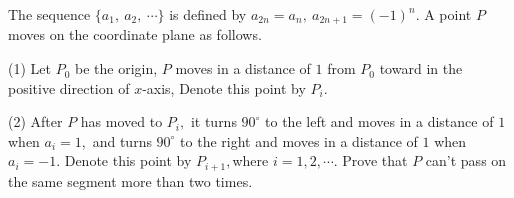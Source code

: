 The sequence $\{a_1,\ a_2,\ \cdots\}$ is defined by $a_{2n}=a_n,\ a_{2n+1}=(-1)^n.$ A point $P$ moves on the coordinate plane as follows.

(1) Let $P_0$ be the origin, $P$ moves in a distance of $1$ from $P_0$ toward in the positive direction of  $x$-axis, Denote this point by $P_i.$

(2) After $P$ has moved to $P_i,$ it turns $90^\circ$ to the left and moves in a distance of $1$ when $a_i=1,$ and turns $90^\circ$ to the right and moves in a distance of $1$ when $a_i=-1.$ Denote this point by $P_{i+1},$where $i=1,2,\cdots.$ Prove that $P$ can't pass on the same segment more than two times.